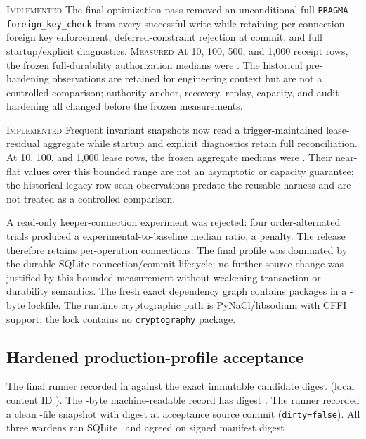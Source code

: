 \documentclass[10pt]{article}
\newcommand{\impl}{\textsc{Implemented}}
\newcommand{\measured}{\textsc{Measured}}
\newcommand{\code}[1]{\nolinkurl{#1}}
\begin{document}
\impl{} The final optimization pass removed an unconditional full
\texttt{PRAGMA foreign\_key\_check} from every successful write while retaining per-connection foreign
key enforcement, deferred-constraint rejection at commit, and full startup/explicit diagnostics.
\measured{} At 10, 100, 500, and 1,000 receipt rows, the frozen full-durability authorization
medians were \ScalingAuthorizeMedians. The historical pre-hardening observations are retained for
engineering context but are not a controlled comparison; authority-anchor, recovery, replay,
capacity, and audit hardening all changed before the frozen measurements.

\impl{} Frequent invariant snapshots now read a trigger-maintained lease-residual aggregate while
startup and explicit diagnostics retain full reconciliation. At 10, 100, and 1,000 lease rows, the
frozen aggregate medians were \InvariantAggregateMedians. Their near-flat values over this bounded
range are not an asymptotic or capacity guarantee; the historical legacy row-scan observations
predate the reusable harness and are not treated as a controlled comparison.

A read-only keeper-connection experiment was rejected: four order-alternated trials produced a
\KeeperRatio{} experimental-to-baseline median ratio, a \KeeperPenalty{} penalty.
The release therefore retains per-operation connections. The final profile was dominated by the
durable SQLite connection/commit lifecycle; no further source change was justified by this bounded
measurement without weakening transaction or durability semantics. The fresh exact dependency
graph contains \LockedPackages{} packages in a \LockBytes-byte lockfile. The runtime cryptographic
path is PyNaCl/libsodium with CFFI support; the lock contains no \code{cryptography} package.

\subsection{Hardened production-profile acceptance}

The final runner recorded \ProductionAcceptanceResult{} in \ProductionAcceptanceDuration{} against
the exact immutable candidate digest \ProductionRuntimeImageDigestDisplay{} (local content ID
\ProductionRuntimeImageIDDisplay). The \ProductionEvidenceBytes-byte machine-readable record has
digest \ProductionEvidenceDigestDisplay. The runner recorded a clean
\ProductionSourceCount-file snapshot with digest \ProductionSourceDigestDisplay{} at acceptance
source commit \ProductionSourceCommit (\code{dirty=false}). All three wardens ran
SQLite~\ProductionSQLiteVersion{} and agreed on signed manifest digest
\ProductionManifestDigestDisplay.
\end{document}
